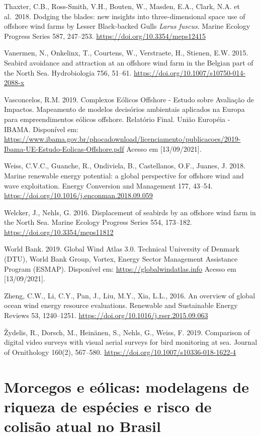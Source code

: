 \documentclass[
  oneside]{scrbook}
\begin{document}
Thaxter, C.B., Ross-Smith, V.H., Bouten, W., Masden, E.A., Clark, N.A. et al.~2018. Dodging the blades: new insights into three-dimensional space use of offshore wind farms by Lesser Black-backed Gulls \emph{Larus fuscus}. Marine Ecology Progress Series 587, 247--253. \url{https://doi.org/10.3354/meps12415}

Vanermen, N., Onkelinx, T., Courtens, W., Verstraete, H., Stienen, E.W. 2015. Seabird avoidance and attraction at an offshore wind farm in the Belgian part of the North Sea. Hydrobiologia 756, 51--61. \url{https://doi.org/10.1007/s10750-014-2088-x}

Vasconcelos, R.M. 2019. Complexos Eólicos Offshore - Estudo sobre Avaliação de Impactos. Mapeamento de modelos decisórios ambientais aplicados na Europa para empreendimentos eólicos offshore. Relatório Final. União Européia - IBAMA. Disponível em: \url{https://www.ibama.gov.br/phocadownload/licenciamento/publicacoes/2019-Ibama-UE-Estudo-Eolicas-Offshore.pdf} Acesso em {[}13/09/2021{]}.

Weiss, C.V.C., Guanche, R., Ondiviela, B., Castellanos, O.F., Juanes, J. 2018. Marine renewable energy potential: a global perspective for offshore wind and wave exploitation. Energy Conversion and Management 177, 43--54. \url{https://doi.org/10.1016/j.enconman.2018.09.059}

Welcker, J., Nehls, G. 2016. Displacement of seabirds by an offshore wind farm in the North Sea. Marine Ecology Progress Series 554, 173--182. \url{https://doi.org/10.3354/meps11812}

World Bank. 2019. Global Wind Atlas 3.0. Technical University of Denmark (DTU), World Bank Group, Vortex, Energy Sector Management Assistance Program (ESMAP). Disponível em: \url{https://globalwindatlas.info} Acesso em {[}13/09/2021{]}.

Zheng, C.W., Li, C.Y., Pan, J., Liu, M.Y., Xia, L.L., 2016. An overview of global ocean wind energy resource evaluations. Renewable and Sustainable Energy Reviews 53, 1240--1251. \url{https://doi.org/10.1016/j.rser.2015.09.063}

Žydelis, R., Dorsch, M., Heinänen, S., Nehls, G., Weiss, F. 2019. Comparison of digital video surveys with visual aerial surveys for bird monitoring at sea. Journal of Ornithology 160(2), 567--580. \url{https://doi.org/10.1007/s10336-018-1622-4}

\hypertarget{morcegos-e-euxf3licas-modelagens-de-riqueza-de-espuxe9cies-e-risco-de-colisuxe3o-atual-no-brasil}{%
\chapter{Morcegos e eólicas: modelagens de riqueza de espécies e risco de colisão atual no Brasil}\label{morcegos-e-euxf3licas-modelagens-de-riqueza-de-espuxe9cies-e-risco-de-colisuxe3o-atual-no-brasil}}
\end{document}
